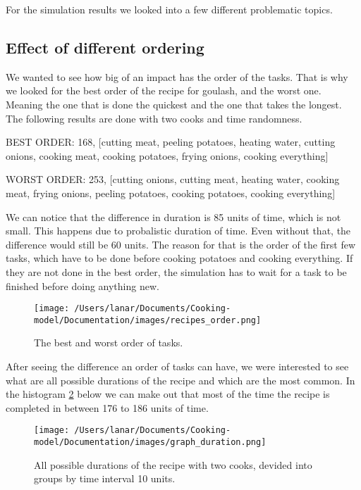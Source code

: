 For the simulation results we looked into a few different problematic topics.

\subsection{Effect of different ordering}
We wanted to see how big of an impact has the order of the tasks. That is why we looked for the best order of the recipe for goulash, and the worst one. 
Meaning the one that is done the quickest and the one that takes the longest.
The following results are done with two cooks and time randomness.

\begin{verbnobox}[\fontsize{10pt}{10pt}\selectfont]
BEST ORDER: 168, 
[cutting meat, peeling potatoes, heating water, cutting onions, cooking meat, 
cooking potatoes, frying onions, cooking everything]
\end{verbnobox}

\begin{verbnobox}[\fontsize{10pt}{10pt}\selectfont]
WORST ORDER: 253,
[cutting onions, cutting meat, heating water, cooking meat,
 frying onions, peeling potatoes, cooking potatoes, cooking everything]
\end{verbnobox}

We can notice that the difference in duration is 85 units of time, which is not small. 
This happens due to probalistic duration of time. Even without that, the difference would still be 60 units. The reason for that is the order of the first few tasks, 
which have to be done before cooking potatoes and cooking everything. If they are not done in the best order, the simulation has to wait for a task to be finished before doing anything new. 

\begin{figure}[H]
    \centerline{\texttt{[image: /Users/lanar/Documents/Cooking-model/Documentation/images/recipes\_order.png]}}
    \caption{The best and worst order of tasks.}
    \label{fig3}
\end{figure}

After seeing the difference an order of tasks can have, we were interested to see what are all possible durations of the recipe and which are the most common. 
In the histogram \ref{fig4} below we can make out that most of the time the recipe is completed in between 176 to 186 units of time.

\begin{figure}[H]
    \centerline{\texttt{[image: /Users/lanar/Documents/Cooking-model/Documentation/images/graph\_duration.png]}}
    \caption{All possible durations of the recipe with two cooks, devided into groups by time interval 10 units.}
    \label{fig4}
\end{figure}

